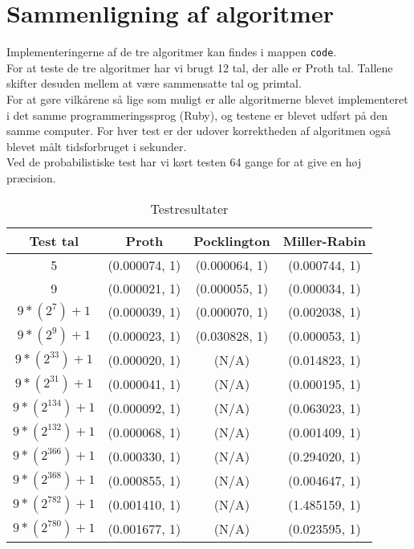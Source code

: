 \section{Sammenligning af algoritmer}
Implementeringerne af de tre algoritmer kan findes i mappen \texttt{code}.\\
For at teste de tre algoritmer har vi brugt 12 tal, der alle er Proth tal. Tallene skifter desuden mellem at være sammensatte tal og primtal. \\
For at gøre vilkårene så lige som muligt er alle algoritmerne blevet implementeret i det samme programmeringssprog (Ruby),
og testene er blevet udført på den samme computer. For hver test er der udover korrektheden af algoritmen også blevet målt tidsforbruget i sekunder.\\
Ved de probabilistiske test har vi kørt testen 64 gange for at give en høj præcision.
\begin{table}
\begin{center}
\begin{tabular}{c | c | c | c  }
\hline 
   Test tal  & Proth & Pocklington & Miller-Rabin \\ \hline
   5 & (0.000074, 1) & (0.000064, 1) & (0.000744, 1) \\ \hline
   9 & (0.000021, 1) & (0.000055, 1) & (0.000034, 1) \\ \hline
   $9*(2^7)+1$ & (0.000039, 1) & (0.000070, 1) & (0.002038, 1) \\ \hline
   $9*(2^9)+1$ & (0.000023, 1) & (0.030828, 1) & (0.000053, 1) \\ \hline
   $9*(2^{33})+1$ & (0.000020, 1) & (N/A) & (0.014823, 1) \\ \hline
   $9*(2^{31})+1$ & (0.000041, 1) & (N/A) & (0.000195, 1) \\ \hline
   $9*(2^{134})+1$ & (0.000092, 1) & (N/A) & (0.063023, 1) \\ \hline
   $9*(2^{132})+1$ & (0.000068, 1) & (N/A) & (0.001409, 1) \\ \hline
   $9*(2^{366})+1$ & (0.000330, 1) & (N/A) & (0.294020, 1) \\ \hline
   $9*(2^{368})+1$ & (0.000855, 1) & (N/A) & (0.004647, 1) \\ \hline
   $9*(2^{782})+1$ & (0.001410, 1) & (N/A) & (1.485159, 1) \\ \hline
   $9*(2^{780})+1$ & (0.001677, 1) & (N/A) & (0.023595, 1)\\ \hline
\end{tabular}
\end{center}
\caption{Testresultater}
\end{table}

